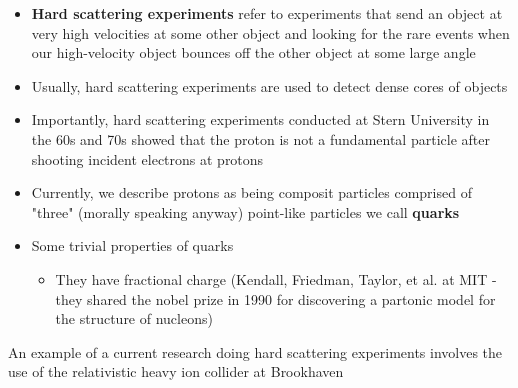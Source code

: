 \documentclass[a4paper]{article}
\begin{document}
\begin{itemize}
    \item \textbf{Hard scattering experiments} refer to experiments that send an object at very high velocities at some other object and looking for the rare events when our high-velocity object bounces off the other object at some large angle
    \item Usually, hard scattering experiments are used to detect dense cores of objects 
    \item Importantly, hard scattering experiments conducted at Stern University in the 60s and 70s showed that the proton is not a fundamental particle after shooting incident electrons at protons 
    \item Currently, we describe protons as being composit particles comprised of "three" (morally speaking anyway) point-like particles we call \textbf{quarks}
    \item Some trivial properties of quarks
    \begin{itemize}
        \item They have fractional charge (Kendall, Friedman, Taylor, et al. at MIT - they shared the nobel prize in 1990 for discovering a partonic model for the structure of nucleons) 
    \end{itemize}
\end{itemize}
An example of a current research doing hard scattering experiments involves the use of the relativistic heavy ion collider at Brookhaven
\end{document}
